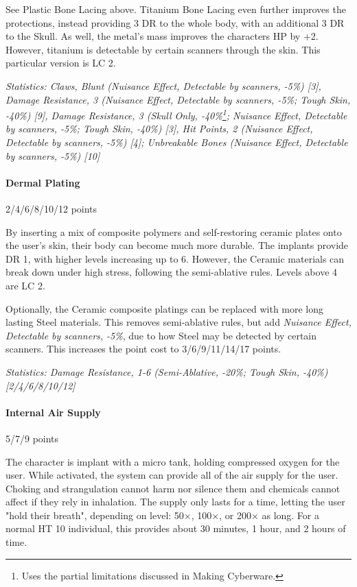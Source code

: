 \begin{multicols*}{3}
	See Plastic Bone Lacing above. Titanium Bone Lacing even further improves the protections, instead providing 3 DR to the whole body, with an additional 3 DR to the Skull. As well, the metal's mass improves the characters HP by +2. However, titanium is detectable by certain scanners through the skin. This particular version is LC 2.
	
	\textit{\textcolor{OliveGreen}{Statistics: Claws, Blunt (Nuisance Effect, Detectable by scanners,  -5\%) [3], Damage Resistance, 3 (Nuisance Effect, Detectable by scanners, -5\%; Tough Skin, -40\%) [9], Damage Resistance, 3 (Skull Only, -40\%\footnote {Uses the partial limitations discussed in Making Cyberware.}; Nuisance Effect, Detectable by scanners, -5\%; Tough Skin, -40\%) [3], Hit Points, 2 (Nuisance Effect, Detectable by scanners,  -5\%) [4]; Unbreakable Bones (Nuisance Effect, Detectable by scanners,  -5\%) [10]}}
	
	\paragraph{Dermal Plating}
	\begin{flushright}
		2/4/6/8/10/12 points
	\end{flushright}
	
	By inserting a mix of composite polymers and self-restoring ceramic plates onto the user's skin, their body can become much more durable. The implants provide DR 1, with higher levels increasing up to 6. However, the Ceramic materials can break down under high stress, following the semi-ablative rules. Levels above 4 are LC 2.
	
	Optionally, the Ceramic composite platings can be replaced with more long lasting Steel materials. This removes semi-ablative rules, but add \textit{Nuisance Effect, Detectable by scanners, -5\%}, due to how Steel may be detected by certain scanners. This increases the point cost to 3/6/9/11/14/17 points. 
	
	\textit{\textcolor{OliveGreen}{Statistics: Damage Resistance, 1-6 (Semi-Ablative, -20\%; Tough Skin, -40\%) [2/4/6/8/10/12]}}
	
	\paragraph{Internal Air Supply}
	\begin{flushright}
		5/7/9 points
	\end{flushright}
	
	The character is implant with a micro tank, holding compressed oxygen for the user. While activated, the system can provide all of the air supply for the user. Choking and strangulation cannot harm nor silence them and chemicals cannot affect if they rely in inhalation. The supply only lasts for a time, letting the user "hold their breath", depending on level: 50×, 100×, or 200× as long. For a normal HT 10 individual, this provides about 30 minutes, 1 hour, and 2 hours of time.
	

\end{multicols*}
